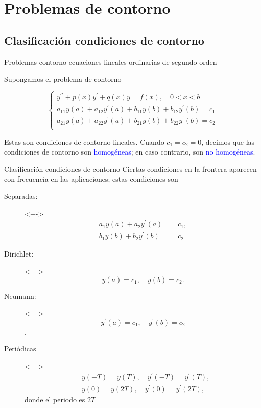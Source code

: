\documentclass[xcolor=dvipsnames,a4paper,10pt,handout]{beamer}
\renewcommand{\emph}[1]{\textcolor{blue}{#1}}
\begin{document}
\section{Problemas de contorno} 
 
\subsection{Clasificación condiciones de contorno}
 
\begin{frame}{Problemas contorno ecuaciones lineales ordinarias de segundo orden}

Supongamos el problema de contorno

\[
 \left\{
        \begin{array}{l}
            y^{\prime \prime}+p(x) y^{\prime}+q(x) y=f(x), \quad 0<x<b\\
            a_{11} y(a)+a_{12} y^{\prime}(a)+b_{11} y(b)+b_{12} y^{\prime}(b)=c_{1}\\
            a_{21} y(a)+a_{22} y^{\prime}(a)+b_{21} y(b)+b_{22} y^{\prime}(b)=c_{2}\\ 
         \end{array}
 \right.
\]

Estas son condiciones de contorno lineales. Cuando $c_{1}=c_{2}=0$, decimos que las condiciones de contorno  son \emph{homogéneas}; en caso contrario, son \emph{no homogéneas}.
\end{frame}


\begin{frame}{Clasificación condiciones de contorno}
Ciertas condiciones en la frontera aparecen con frecuencia en las aplicaciones; estas condiciones son

\begin{description}
 \item[Separadas:]<+->
 \[\begin{split}
    a_{1} y(a)+a_{2} y^{\prime}(a)&=c_{1},\\
    b_{1} y(b)+b_{2} y^{\prime}(b)&=c_{2}
   \end{split}
\]
\item[Dirichlet:]<+-> $$y(a)=c_{1},\quad y(b)=c_{2} .$$
\item[Neumann:]<+-> $$y^{\prime}(a)=c_{1},\quad y^{\prime}(b)=c_{2}$$.
\item[Periódicas]<+-> 
$$
\begin{aligned}
&y(-T)=y(T), \quad y^{\prime}(-T)=y^{\prime}(T), \\
&y(0)=y(2 T), \quad y^{\prime}(0)=y^{\prime}(2 T),
\end{aligned}
$$
donde el periodo es $2 T$
\end{description}

\end{frame}
\end{document}
